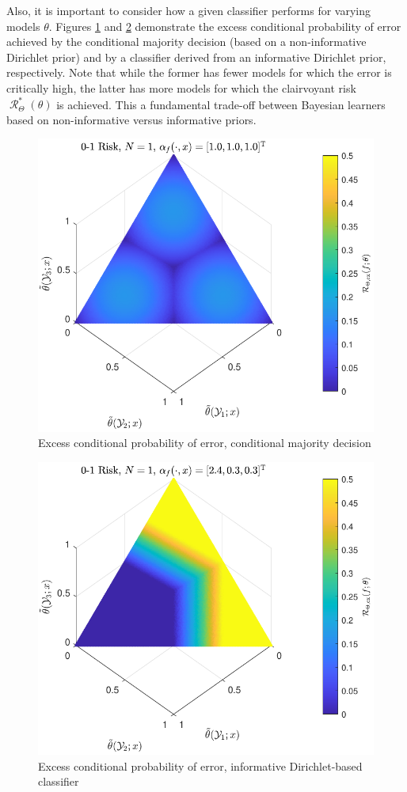 \documentclass[12pt]{report}
\DeclareMathOperator{\Rcal}{\mathcal{R}}
\begin{document}
Also, it is important to consider how a given classifier performs for varying models $\theta$. Figures \ref{fig:Risk_cond_ex_01_Dir_theta__uni} and \ref{fig:Risk_cond_ex_01_Dir_theta__subj} demonstrate the excess conditional probability of error achieved by the conditional majority decision (based on a non-informative Dirichlet prior) and by a classifier derived from an informative Dirichlet prior, respectively. Note that while the former has fewer models for which the error is critically high, the latter has more models for which the clairvoyant risk $\Rcal_{\Theta}^*(\theta)$ is achieved. This a fundamental trade-off between Bayesian learners based on non-informative versus informative priors.
\begin{figure}
\centering
\includegraphics[width=0.7\linewidth]{Risk_cond_ex_01_Dir_theta__uni_clim.pdf}
\caption{Excess conditional probability of error, conditional majority decision}
\label{fig:Risk_cond_ex_01_Dir_theta__uni}
\end{figure}
%
\begin{figure}
\centering
\includegraphics[width=0.7\linewidth]{Risk_cond_ex_01_Dir_theta__subj_clim.pdf}
\caption{Excess conditional probability of error, informative Dirichlet-based classifier}
\label{fig:Risk_cond_ex_01_Dir_theta__subj}
\end{figure}
\end{document}
